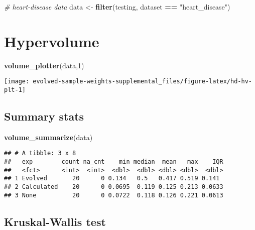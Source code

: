 \documentclass[
]{book}
\newenvironment{Shaded}{\begin{snugshade}}{\end{snugshade}}
\newcommand{\CommentTok}[1]{\textcolor[rgb]{0.56,0.35,0.01}{\textit{#1}}}
\newcommand{\DecValTok}[1]{\textcolor[rgb]{0.00,0.00,0.81}{#1}}
\newcommand{\FunctionTok}[1]{\textcolor[rgb]{0.13,0.29,0.53}{\textbf{#1}}}
\newcommand{\NormalTok}[1]{#1}
\newcommand{\OtherTok}[1]{\textcolor[rgb]{0.56,0.35,0.01}{#1}}
\newcommand{\SpecialCharTok}[1]{\textcolor[rgb]{0.81,0.36,0.00}{\textbf{#1}}}
\newcommand{\StringTok}[1]{\textcolor[rgb]{0.31,0.60,0.02}{#1}}
\begin{document}
\begin{Shaded}
\begin{Highlighting}[]
\CommentTok{\# heart{-}disease data}
\NormalTok{data }\OtherTok{\textless{}{-}} \FunctionTok{filter}\NormalTok{(testing, dataset }\SpecialCharTok{==} \StringTok{"heart\_disease"}\NormalTok{)}
\end{Highlighting}
\end{Shaded}

\hypertarget{hypervolume}{%
\section{Hypervolume}\label{hypervolume}}

\begin{Shaded}
\begin{Highlighting}[]
\FunctionTok{volume\_plotter}\NormalTok{(data,}\DecValTok{1}\NormalTok{)}
\end{Highlighting}
\end{Shaded}

\texttt{[image: evolved-sample-weights-supplemental\_files/figure-latex/hd-hv-plt-1]}

\hypertarget{summary-stats}{%
\subsection{Summary stats}\label{summary-stats}}

\begin{Shaded}
\begin{Highlighting}[]
\FunctionTok{volume\_summarize}\NormalTok{(data)}
\end{Highlighting}
\end{Shaded}

\begin{verbatim}
## # A tibble: 3 x 8
##   exp        count na_cnt    min median  mean   max    IQR
##   <fct>      <int>  <int>  <dbl>  <dbl> <dbl> <dbl>  <dbl>
## 1 Evolved       20      0 0.134   0.5   0.417 0.519 0.141 
## 2 Calculated    20      0 0.0695  0.119 0.125 0.213 0.0633
## 3 None          20      0 0.0722  0.118 0.126 0.221 0.0613
\end{verbatim}

\hypertarget{kruskal-wallis-test}{%
\subsection{Kruskal-Wallis test}\label{kruskal-wallis-test}}
\end{document}
